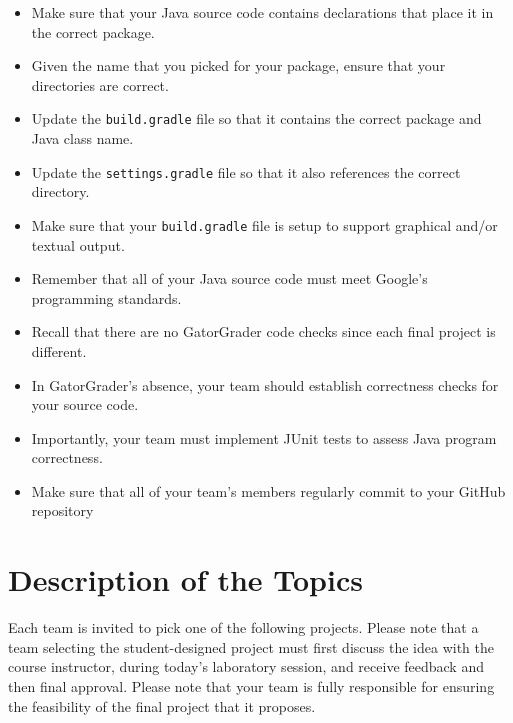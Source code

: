 \documentclass[11pt]{article}
\newcommand{\program}[1]{\lstinline{#1}}
\begin{document}
\begin{itemize}
  \setlength{\itemsep}{0in}
  \item Make sure that your Java source code contains declarations that place it in the correct package.
  \item Given the name that you picked for your package, ensure that your directories are correct.
  \item Update the \program{build.gradle} file so that it contains the correct package and Java class name.
  \item Update the \program{settings.gradle} file so that it also references the correct directory.
  \item Make sure that your \program{build.gradle} file is setup to support graphical and/or textual output.
  \item Remember that all of your Java source code must meet Google's programming standards.
  \item Recall that there are no GatorGrader code checks since each final project is different.
  \item In GatorGrader's absence, your team should establish correctness checks for your source code.
  \item Importantly, your team must implement JUnit tests to assess
    Java program correctness.
  \item Make sure that all of your team's members regularly commit to your
    GitHub repository
\end{itemize}

\section*{Description of the Topics}

Each team is invited to pick one of the following projects. Please note that a
team selecting the student-designed project must first discuss the idea with the
course instructor, during today's laboratory session, and receive feedback and
then final approval. Please note that your team is fully responsible for
ensuring the feasibility of the final project that it proposes.

\end{document}

